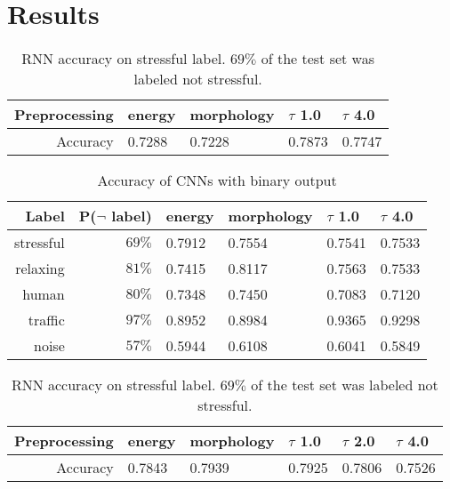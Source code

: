 \section{Results}

\begin{table}
\renewcommand{\arraystretch}{1.3}
\centering
\caption{RNN accuracy on stressful label. $69\%$ of the test set was labeled not stressful.}
\begin{tabular}{r||l|l|l|l}\hline
Preprocessing &energy &morphology & $\tau$ 1.0 & $\tau$ 4.0\\\hline
Accuracy      &0.7288 &0.7228 &0.7873 &0.7747
\end{tabular}
\label{tab:blstmacc}
\end{table}


\begin{table}
\renewcommand{\arraystretch}{1.3}
\centering
\caption{Accuracy of CNNs with binary output}
\begin{tabular}{r|r||l|l|l|l}\hline
Label     & P($\neg$ label) &energy &morphology & $\tau$ 1.0 & $\tau$ 4.0\\\hline
stressful & $69\%$          & 0.7912 & 0.7554 & 0.7541 & 0.7533 \\
relaxing  & $81\%$          & 0.7415 & 0.8117 & 0.7563 & 0.7533 \\
human     & $80\%$          & 0.7348 & 0.7450 & 0.7083 & 0.7120 \\ 
traffic   & $97\%$          & 0.8952 & 0.8984 & 0.9365 & 0.9298 \\
noise     & $57\%$          & 0.5944 & 0.6108 & 0.6041 & 0.5849

\end{tabular}
\label{tab:cnnacc}
\end{table}


\begin{table}
\renewcommand{\arraystretch}{1.3}
\centering
\caption{RNN accuracy on stressful label. $69\%$ of the test set was labeled not stressful.}
\begin{tabular}{r||l|l|l|l}\hline
Preprocessing &energy &morphology & $\tau$ 1.0 & $\tau$ 2.0 & $\tau$ 4.0\\\hline
Accuracy      &0.7843 &0.7939 &0.7925 &0.7806 & 0.7526
\end{tabular}
\label{tab:blstmacc}
\end{table}

